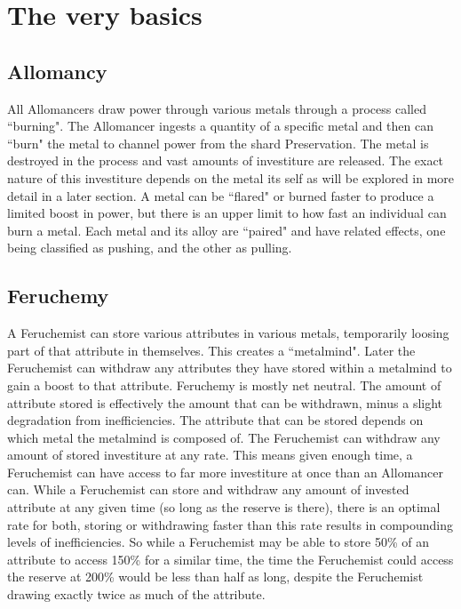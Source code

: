 \documentclass[conference]{IEEEtran}
\begin{document}
\section*{The very basics}
\subsection*{Allomancy}
All Allomancers draw power through various metals through a process called ``burning".\cite{TFE-CH7}  The Allomancer ingests a quantity of a specific metal and then can ``burn" the metal to channel power from the shard Preservation\cite{allo-source}.  The metal is destroyed in the process and vast amounts of investiture are released.  The exact nature of this investiture depends on the metal its self\cite{TFE-CH7} as will be explored in more detail in a later section.  A metal can be ``flared" or burned faster to produce a limited boost in power, but there is an upper limit to how fast an individual can burn a metal.  Each metal and its alloy are ``paired" and have related effects, one being classified as pushing, and the other as pulling.\cite{TFE-CH7}
\subsection*{Feruchemy}
A Feruchemist can store various attributes in various metals, temporarily loosing part of that attribute in themselves.\cite{TFE-CH22}   This creates a ``metalmind".  Later the Feruchemist can withdraw any attributes they have stored within a metalmind to gain a boost to that attribute.  Feruchemy is mostly net neutral.  The amount of attribute stored is effectively the amount that can be withdrawn, minus a slight degradation from inefficiencies.  The attribute that can be stored depends on which metal the metalmind is composed of.\cite{TFE-CH22}  The Feruchemist can withdraw any amount of stored investiture at any rate.  This means given enough time, a Feruchemist can have access to far more investiture at once than an Allomancer can.\cite{TFE-CH27}
While a Feruchemist can store and withdraw any amount of invested attribute at any given time (so long as the reserve is there), there is an optimal rate for both, storing or withdrawing faster than this rate results in compounding levels of inefficiencies.  So while a Feruchemist may be able to store 50\% of an attribute to access 150\% for a similar time, the time the Feruchemist could access the reserve at 200\% would be less than half as long, despite the Feruchemist drawing exactly twice as much of the attribute.\cite{fe-decay}
\end{document}
